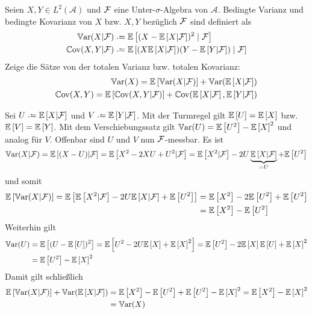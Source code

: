 \begin{exercisePage}
	
	\begin{task}
		Seien $X,Y \in L^2(\mathcal{A})$ und $\F$ eine Unter-$\sigma$-Algebra von $\mathcal{A}$. Bedingte
		Varianz und bedingte Kovarianz von $X$ bzw. $X,Y$ bezüglich $\F$ sind definiert als
		\begin{align*}
			\Var(X | \F) &\defeq \EW[{(X - \EW[X | \F])^2 \mid \F}] \\
			\Cov(X,Y | \F) &\defeq \EW[ {(X  \EW[X | \F]) (Y - \EW[Y | \F]) \mid \F} ]
		\end{align*}
		Zeige die Sätze von der totalen Varianz bzw. totalen Kovarianz:
		\begin{align*}
			\Var(X) = \EW[\Var(X | \F)] + \Var(\EW[X | \F]) \\
			\Cov(X,Y) = \EW[ \Cov(X,Y | \F) ] + \Cov( \EW[X | \F] , \EW[Y | \F])
		\end{align*}
	\end{task}

	Sei $U \defeq \EW[X | \F]$ und $V \defeq \EW[Y | \F]$. Mit der Turmregel gilt $\EW[U] = \EW[X]$ bzw. $\EW[V] = \EW[Y]$. Mit dem Verschiebungssatz gilt $\Var(U) = \EW[U^2] - \EW[X]^2$ und analog für $V$.
	Offenbar sind $U$ und $V$ nun $\F$-messbar.
	Es ist
	\begin{equation*}
		\Var(X | \F) = \EW[(X - U) | \F]
		= \EW[X^2 - 2XU + U^2 | \F] 
		= \EW[X^2 | \F] - 2U \underbrace{\EW[X | \F]}_{= U} + \EW[U^2]
	\end{equation*}
	und somit
	\begin{align*}
		\EW[\Var(X | \F)] 
		= \EW[ {\EW[X^2 | \F] - 2U \EW[X | \F] + \EW[U^2]} ] 
		&= \EW[X^2] - 2 \EW[U^2] + \EW[U^2] \\
		&= \EW[X^2] - \EW[U^2]
	\end{align*}
	Weiterhin gilt
	\begin{align*}
		\Var(U) &= \EW[ {(U- \EW[U])^2} ] = \EW[ {U^2 - 2 U \EW[X] + \EW[X]^2} ] 
		= \EW[U^2] - 2 \EW[X] \EW[U] + \EW[X]^2 \\
		&= \EW[U^2]- \EW[X]^2 
	\end{align*}
	Damit gilt schließlich 
	\begin{align*}
		\EW[\Var(X | \F)] + \Var(\EW[X | \F]) 
		&= \EW[X^2] - \EW[U^2] + \EW[U^2]- \EW[X]^2  
		= \EW[X^2] - \EW[X]^2 \\
		&= \Var(X)
	\end{align*}
	

\end{exercisePage}
